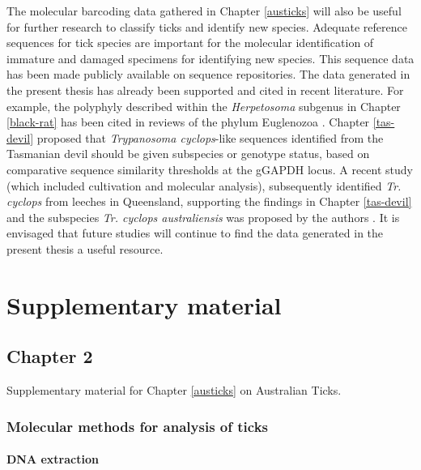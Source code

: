 \documentclass[a4paper, nobind]{templates/ociamthesis}
\begin{document}
The molecular barcoding data gathered in Chapter \ref{austicks} will also be useful for further research to classify ticks and identify new species. Adequate reference sequences for tick species are important for the molecular identification of immature and damaged specimens for identifying new species.
This sequence data has been made publicly available on sequence repositories.
The data generated in the present thesis has already been supported and cited in recent literature.
For example, the polyphyly described within the \emph{Herpetosoma} subgenus in Chapter \ref{black-rat} has been cited in reviews of the phylum Euglenozoa \autocite{kostygovEuglenozoaTaxonomyDiversity2021}.
Chapter \ref{tas-devil} proposed that \emph{Trypanosoma cyclops}-like sequences identified from the Tasmanian devil should be given subspecies or genotype status, based on comparative sequence similarity thresholds at the gGAPDH locus.
A recent study (which included cultivation and molecular analysis), subsequently identified \emph{Tr. cyclops} from leeches in Queensland, supporting the findings in Chapter \ref{tas-devil} and the subspecies \emph{Tr. cyclops australiensis} was proposed by the authors \autocite{ellisNewSubspeciesTrypanosoma2021}.
It is envisaged that future studies will continue to find the data generated in the present thesis a useful resource.

\startappendices

\hypertarget{supplementary-material}{%
\chapter{Supplementary material}\label{supplementary-material}}

\hypertarget{ch2supp}{%
\section{Chapter 2}\label{ch2supp}}

Supplementary material for Chapter \ref{austicks} on Australian Ticks.

\hypertarget{molecular-methods-for-analysis-of-ticks}{%
\subsection{Molecular methods for analysis of ticks}\label{molecular-methods-for-analysis-of-ticks}}

\hypertarget{dna-extraction-1}{%
\subsubsection{DNA extraction}\label{dna-extraction-1}}
\end{document}
